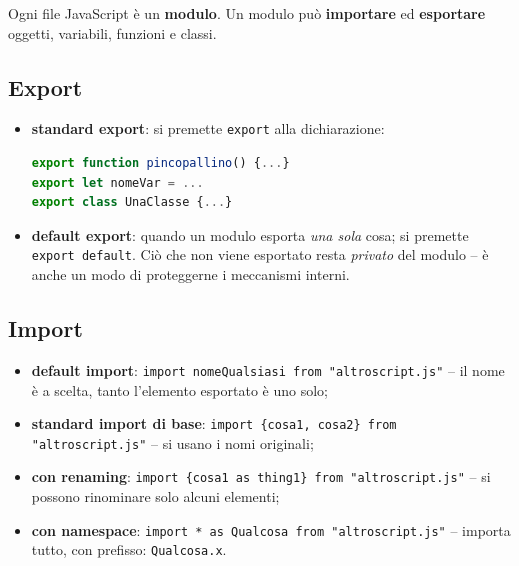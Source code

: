 \begin{definizione}[Moduli]
Ogni file JavaScript \`e un \textbf{modulo}. Un modulo pu\`o \textbf{importare} ed
\textbf{esportare} oggetti, variabili, funzioni e classi.
\end{definizione}

\subsection{Export}
\begin{itemize}
  \item \textbf{standard export}: si premette \texttt{export} alla dichiarazione:
\begin{lstlisting}[language=JavaScript]
export function pincopallino() {...}
export let nomeVar = ...
export class UnaClasse {...}
\end{lstlisting}
  \item \textbf{default export}: quando un modulo esporta \emph{una sola} cosa; si premette
        \texttt{export default}. Ci\`o che non viene esportato resta \emph{privato} del
        modulo -- \`e anche un modo di proteggerne i meccanismi interni.
\end{itemize}

\subsection{Import}
\begin{itemize}
  \item \textbf{default import}: \texttt{import nomeQualsiasi from "altroscript.js"} --
        il nome \`e a scelta, tanto l'elemento esportato \`e uno solo;
  \item \textbf{standard import di base}:
        \texttt{import \{cosa1, cosa2\} from "altroscript.js"} -- si usano i nomi originali;
  \item \textbf{con renaming}:
        \texttt{import \{cosa1 as thing1\} from "altroscript.js"} -- si possono rinominare
        solo alcuni elementi;
  \item \textbf{con namespace}: \texttt{import * as Qualcosa from "altroscript.js"} --
        importa tutto, con prefisso: \texttt{Qualcosa.x}.
\end{itemize}
